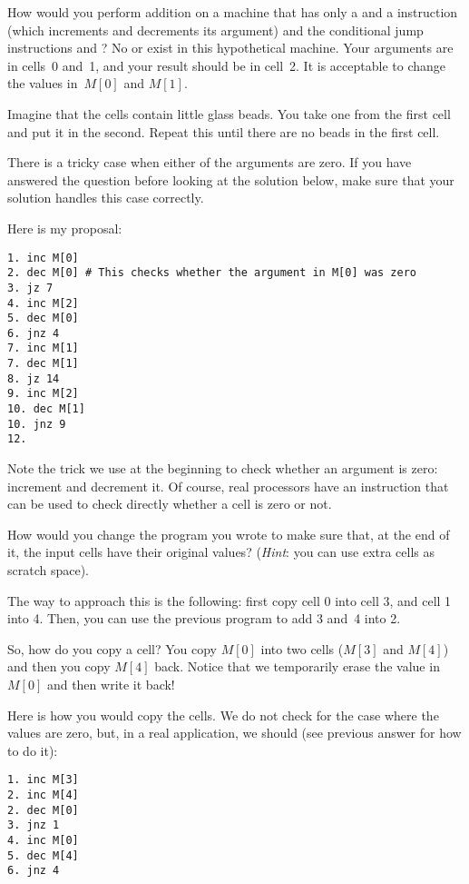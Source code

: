 \begin{exercise}
How would you perform addition on a machine that has only a 
and a  instruction (which increments and decrements its
argument) and the conditional jump instructions  and
? No  or  exist in this
hypothetical machine. Your arguments are in cells~0 and~1, and your result
should be in cell~2. It is acceptable to change the values in~$M[0]$ and
$M[1]$.
\begin{solution}
Imagine that the cells contain little glass beads. You take one from the first
cell and put it in the second. Repeat this until there are no beads in the
first cell.

There is a tricky case when either of the arguments are zero. If you have
answered the question before looking at the solution below, make sure that your
solution handles this case correctly.

Here is my proposal:

\begin{verbatim}
1. inc M[0]
2. dec M[0] # This checks whether the argument in M[0] was zero
3. jz 7
4. inc M[2]
5. dec M[0]
6. jnz 4
7. inc M[1]
7. dec M[1]
8. jz 14
9. inc M[2]
10. dec M[1]
10. jnz 9
12.
\end{verbatim}

Note the trick we use at the beginning to check whether an argument is zero:
increment and decrement it. Of course, real processors have an instruction that
can be used to check directly whether a cell is zero or not.
\end{solution}
\end{exercise}

\begin{exercise}
How would you change the program you wrote to make sure that, at the end of it,
the input cells have their original values? (\emph{Hint}: you can use extra
cells as scratch space).
\begin{solution}
The way to approach this is the following: first copy cell 0 into cell 3, and
cell 1 into 4. Then, you can use the previous program to add 3 and~4 into 2.

So, how do you copy a cell? You copy $M[0]$ into two cells ($M[3]$ and $M[4]$)
and then you copy $M[4]$ back. Notice that we temporarily erase the value in
$M[0]$ and then write it back!

Here is how you would copy the cells. We do not check for the case where the
values are zero, but, in a real application, we should (see previous answer for
how to do it):

\begin{verbatim}
1. inc M[3]
2. inc M[4]
2. dec M[0]
3. jnz 1
4. inc M[0]
5. dec M[4]
6. jnz 4
\end{verbatim}
\end{solution}
\end{exercise}

